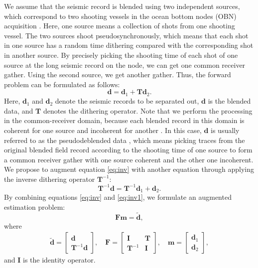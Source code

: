 We assume that the seismic record is blended using two independent sources, which correspond to two shooting vessels in the ocean bottom nodes (OBN) acquisition \cite[]{obn}. Here, one source means a collection of shots from one shooting vessel. The
two sources shoot pseudosynchronously, which means that each shot in one source has a random time dithering compared with the corresponding shot in another source.  By precisely picking the shooting time of each shot of one source at the long seismic record on the node, we can get one common receiver gather. Using the second source, we get another gather.
Thus, the forward problem can be formulated as follows:
\begin{equation}
\label{eq:inv}
\mathbf{d}=\mathbf{d}_1+\mathbf{Td}_2.
\end{equation}
Here, $\mathbf{d}_1$ and $\mathbf{d}_2$ denote the seismic records to be separated out, $\mathbf{d}$ is the blended data, and $\mathbf{T}$ denotes the dithering operator. Note that we perform the processing in the common-receiver domain, because each blended record in this domain is coherent for one source and incoherent for another \cite[]{gary}. In this case, $\mathbf{d}$ is usually referred to as the pseudodeblended data \cite[]{mahdad2011}, which means picking traces from the original blended field record according to the shooting time of one source to form a common receiver gather with one source coherent and the other one incoherent. 
We propose to augment equation \ref{eq:inv} with another equation through applying the inverse dithering operator $\mathbf{T}^{-1}$:
\begin{equation}
\label{eq:inv1}
\mathbf{T}^{-1}\mathbf{d}=\mathbf{T}^{-1}\mathbf{d}_1+\mathbf{d}_2.
\end{equation}
By combining equations \ref{eq:inv} and \ref{eq:inv1}, we formulate an augmented estimation problem:
\begin{equation}
\label{eq:esti}
\mathbf{Fm}=\mathbf{\tilde{d}},
\end{equation}
where
\begin{eqnarray}
\label{eq:note}
\mathbf{\tilde{d}}=
\left[\begin{array}{cc}
\mathbf{d}\\
\mathbf{T}^{-1}\mathbf{d}
\end{array}\right],
\quad
\mathbf{F}=
\left[\begin{array}{cc}
\mathbf{I} 	& \mathbf{T}\\
\mathbf{T}^{-1} & \mathbf{I}
\end{array}\right],
\quad
\mathbf{m}=
\left[\begin{array}{cc}
\mathbf{d}_1\\
\mathbf{d}_2
\end{array}\right],
\end{eqnarray}
and $\mathbf{I}$ is the identity operator.

